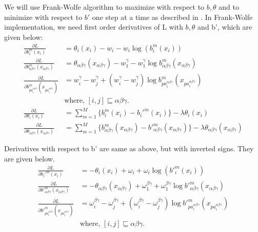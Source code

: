 \documentclass{article}
\begin{document}
We will use Frank-Wolfe algorithm to maximize with respect to $b, \theta$ and to minimize with respect to $b'$ one step at a time as described in \cite{Tang2016}. In Frank-Wolfe implementation, we need first order derivatives of L with $ b,\theta$ and b', which are given below:
\begin{align*}
\frac{\partial L}{\partial b_i^m(x_i)}&=\theta_i(x_i) - w_i - w_i\log\left(b^m_i(x_i)\right)\\
\frac{\partial L}{\partial b^m_{\alpha\beta\gamma}(x_{\alpha\beta\gamma})}&=\theta_{\alpha\beta\gamma}(x_{\alpha\beta\gamma}) - w_1^{\gamma}- w_1^{\gamma}\log b^m_{\alpha\beta\gamma}(x_{\alpha\beta\gamma})\\
\frac{\partial L}{\partial b^m_{pa_i^{\alpha\beta\gamma}}(x_{pa_i^{\alpha\beta\gamma}})}&=w_i^{\gamma}-w_j^{\gamma} + (w_i^{\gamma}-w_j^{\gamma})\log b^m_{pa_i^{\alpha\beta\gamma}}(x_{pa_i^{\alpha\beta\gamma}})\\
&\text{where, $[i,j]\sqsubseteq \alpha\beta\gamma$.}\\
\frac{\partial L}{\partial \theta_i(x_i)}&=\sum_{m=1}^M\{b_i^m(x_i)-b_i'^m(x_i)\}-\lambda\theta_i(x_i)\\
\frac{\partial L}{\partial \theta_{\alpha\beta\gamma}(x_{\alpha\beta\gamma})}&=\sum_{m=1}^M\{b^m_{\alpha\beta\gamma}(x_{\alpha\beta\gamma})-b'^m_{\alpha\beta\gamma}(x_{\alpha\beta\gamma})\}-\lambda\theta_{\alpha\beta\gamma}(x_{\alpha\beta\gamma})
\end{align*}

Derivatives with respect to b' are same as above, but with inverted signs. They are given below.
\begin{align*}
\frac{\partial L}{\partial b_i'^m(x_i)}&=-\theta_i(x_i)+ \omega_i + \omega_i\log\left(b'^m_i(x_i)\right)\\
\frac{\partial L}{\partial b'^m_{\alpha\beta\gamma}(x_{\alpha\beta\gamma})}&=-\theta_{\alpha\beta\gamma}(x_{\alpha\beta\gamma}) + \omega_1^{\beta\gamma}+ \omega_1^{\beta\gamma}\log b'^m_{\alpha\beta\gamma}(x_{\alpha\beta\gamma})\\
\frac{\partial L}{\partial b'^m_{pa_i^{\alpha\beta\gamma}}(x_{pa_i^{\alpha\beta\gamma}})}&=\omega_i^{\beta\gamma}-\omega_j^{\beta\gamma} + (\omega_i^{\beta\gamma}-\omega_j^{\beta\gamma})\log b'^m_{pa_i^{\alpha\beta\gamma}}(x_{pa_i^{\alpha\beta\gamma}})\\
&\text{where, $[i,j]\sqsubseteq \alpha\beta\gamma$.}
\end{align*}
\end{document}

